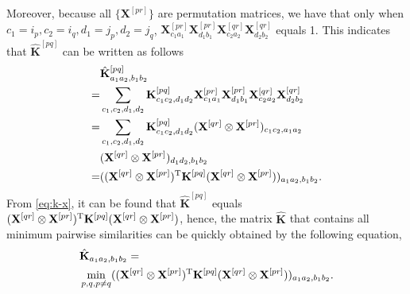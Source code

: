 Moreover, because all $\{\mathbf X^{[pr]}\}$ are permutation matrices, we have that only when $c_1 = i_p, c_2 = i_q, d_1=j_p, d_2=j_q$, $\mathbf X^{[pr]}_{c_1a_1}\mathbf X^{[pr]}_{d_1b_1}\mathbf X^{[qr]}_{c_2a_2}\mathbf X^{[qr]}_{d_2b_2}$ equals 1. This indicates that $\hat{\mathbf K}^{[pq]}$ can be written as follows
\begin{equation}
    \begin{split}
        & \hat{\mathbf K}^{[pq]}_{a_1a_2, b_1b_2} \\
        = & \sum_{c_1, c_2, d_1, d_2} \mathbf K^{[pq]}_{c_1c_2, d_1d_2}\mathbf X^{[pr]}_{c_1a_1}\mathbf X^{[pr]}_{d_1b_1}\mathbf X^{[qr]}_{c_2a_2}\mathbf X^{[qr]}_{d_2b_2} \\
        = & \sum_{c_1, c_2, d_1, d_2} \mathbf K^{[pq]}_{c_1c_2, d_1d_2}(\mathbf X^{[qr]}\otimes \mathbf X^{[pr]})_{c_1c_2, a_1a_2} \\
        & (\mathbf X^{[qr]}\otimes \mathbf X^{[pr]})_{d_1d_2, b_1b_2} \\
        = & ((\mathbf X^{[qr]}\otimes \mathbf X^{[pr]})^{\rm T} \mathbf K^{[pq]} (\mathbf X^{[qr]}\otimes \mathbf X^{[pr]}))_{a_1a_2, b_1b_2}.
    \end{split}
    \label{eq:k-x}
\end{equation}
From \cref{eq:k-x}, it can be found that $\hat{\mathbf K}^{[pq]}$ equals $(\mathbf X^{[qr]}\otimes \mathbf X^{[pr]})^{\rm T} \mathbf K^{[pq]} (\mathbf X^{[qr]}\otimes \mathbf X^{[pr]})$, hence, the matrix $\hat{\mathbf K}$ that contains all minimum pairwise similarities can be quickly obtained by the following equation,
\begin{equation}
    \begin{split}
        & \hat{\mathbf K}_{a_1a_2,b_1b_2} = \\
        & \min_{p, q, p \neq q} ((\mathbf X^{[qr]}\otimes \mathbf X^{[pr]})^{\rm T} \mathbf K^{[pq]} (\mathbf X^{[qr]}\otimes \mathbf X^{[pr]}))_{a_1a_2,b_1b_2}.
    \end{split}
\end{equation}


